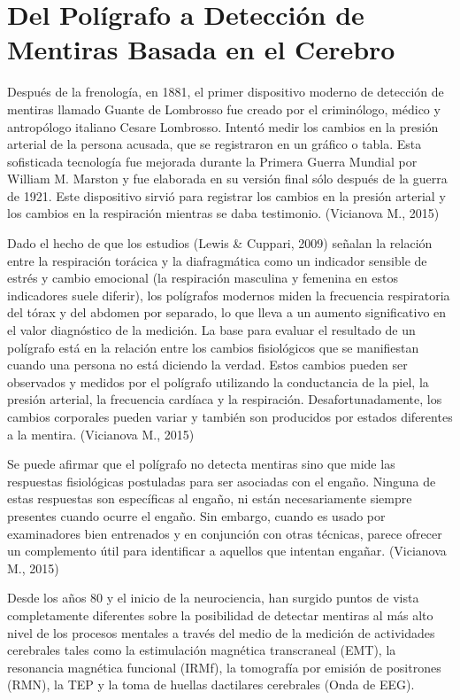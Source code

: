 \section{Del Polígrafo a Detección de Mentiras Basada en el Cerebro}
Después de la frenología, en 1881, el primer dispositivo moderno de detección de mentiras llamado Guante de Lombrosso fue creado por el criminólogo, médico y antropólogo italiano Cesare Lombrosso. Intentó medir los cambios en la presión arterial de la persona acusada, que se registraron en un gráfico o tabla. Esta sofisticada tecnología fue mejorada durante la Primera Guerra Mundial por William M. Marston y fue elaborada en su versión final sólo después de la guerra de 1921. Este dispositivo sirvió para registrar los cambios en la presión arterial y los cambios en la respiración mientras se daba testimonio. (Vicianova M., 2015) 

Dado el hecho de que los estudios (Lewis \& Cuppari, 2009) señalan la relación entre la respiración torácica y la diafragmática como un indicador sensible de estrés y cambio emocional (la respiración masculina y femenina en estos indicadores suele diferir), los polígrafos modernos miden la frecuencia respiratoria del tórax y del abdomen por separado, lo que lleva a un aumento significativo en el valor diagnóstico de la medición. La base para evaluar el resultado de un polígrafo está en la relación entre los cambios fisiológicos que se manifiestan cuando una persona no está diciendo la verdad. Estos cambios pueden ser observados y medidos por el polígrafo utilizando la conductancia de la piel, la presión arterial, la frecuencia cardíaca y la respiración. Desafortunadamente, los cambios corporales pueden variar y también son producidos por estados diferentes a la mentira. (Vicianova M., 2015) 

Se puede afirmar que el polígrafo no detecta mentiras sino que mide las respuestas fisiológicas postuladas para ser asociadas con el engaño. Ninguna de estas respuestas son específicas al engaño, ni están necesariamente siempre presentes cuando ocurre el engaño. Sin embargo, cuando es usado por examinadores bien entrenados y en conjunción con otras técnicas, parece ofrecer un complemento útil para identificar a aquellos que intentan engañar. (Vicianova M., 2015) 

Desde los años 80 y el inicio de la neurociencia, han surgido puntos de vista completamente diferentes sobre la posibilidad de detectar mentiras al más alto nivel de los procesos mentales a través del medio de la medición de actividades cerebrales tales como la estimulación magnética transcraneal (EMT), la resonancia magnética funcional (IRMf), la tomografía por emisión de positrones (RMN), la TEP y la toma de huellas dactilares cerebrales (Onda de EEG).


